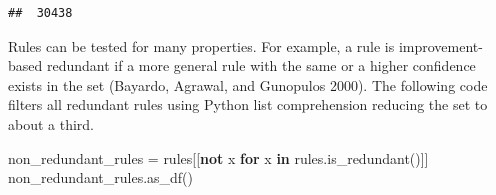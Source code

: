 \documentclass{article}
\newenvironment{Shaded}{}{}
\newcommand{\ControlFlowTok}[1]{\textcolor[rgb]{0.00,0.44,0.13}{\textbf{#1}}}
\newcommand{\KeywordTok}[1]{\textcolor[rgb]{0.00,0.44,0.13}{\textbf{#1}}}
\newcommand{\NormalTok}[1]{#1}
\newcommand{\OperatorTok}[1]{\textcolor[rgb]{0.40,0.40,0.40}{#1}}
\begin{document}
\begin{verbatim}
##  30438
\end{verbatim}

Rules can be tested for many properties. For example, a rule is
improvement-based redundant if a more general rule with the same or a
higher confidence exists in the set (Bayardo, Agrawal, and Gunopulos
2000). The following code filters all redundant rules using Python list
comprehension reducing the set to about a third.

\begin{Shaded}
\begin{Highlighting}[]
\NormalTok{non\_redundant\_rules }\OperatorTok{=}\NormalTok{ rules[[}\KeywordTok{not}\NormalTok{ x }\ControlFlowTok{for}\NormalTok{ x }\KeywordTok{in}\NormalTok{ rules.is\_redundant()]]}
\NormalTok{non\_redundant\_rules.as\_df()}
\end{Highlighting}
\end{Shaded}
\end{document}
